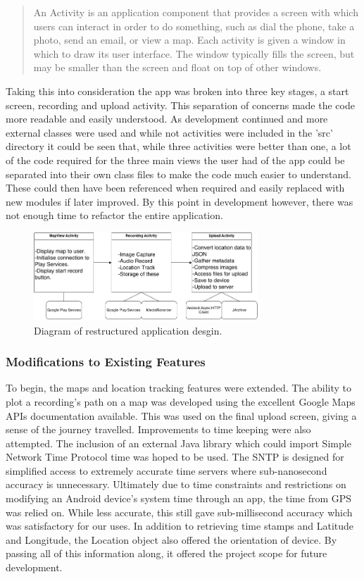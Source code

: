 \documentclass{l3proj}
\begin{document}
\blockquote{An Activity is an application component that provides a screen with which users can interact in order to do something, such as dial the phone, take a photo, send an email, or view a map. Each activity is given a window in which to draw its user interface. The window typically fills the screen, but may be smaller than the screen and float on top of other windows.}

Taking this into consideration the app was broken into three key stages, a start screen, recording and upload activity. This separation of concerns made the code more readable and easily understood. As development continued and more external classes were used and while not activities were included in the 'src' directory it could be seen that, while three activities were better than one, a lot of the code required for the three main views the user had of the app could be separated into their own class files to make the code much easier to understand. These could then have been referenced when required and easily replaced with new modules if later improved. By this point in development however, there was not enough time to refactor the entire application.

\begin{figure}[ht!]
\centering
\includegraphics[width=0.75\textwidth]{images/android-app-structure.png}
\caption{Diagram of restructured application desgin.}
\end{figure}

\subsubsection{Modifications to Existing Features}
To begin, the maps and location tracking features were extended. The ability to plot a recording's path on a map was developed using the excellent Google Maps APIs documentation available. This was used on the final upload screen, giving a sense of the journey travelled. Improvements to time keeping were also attempted. The inclusion of an external Java library which could import Simple Network Time Protocol time was hoped to be used. The SNTP is designed for simplified access to extremely accurate time servers where sub-nanosecond accuracy is unnecessary. Ultimately due to time constraints and restrictions on modifying an Android device's system time through an app, the time from GPS was relied on. While less accurate, this still gave sub-millisecond accuracy which was satisfactory for our uses. In addition to retrieving time stamps and Latitude and Longitude, the Location object also offered the orientation of device. By passing all of this information along, it offered the project scope for future development.
\end{document}
